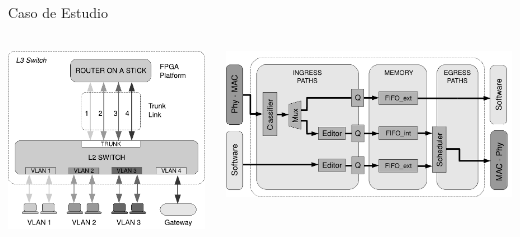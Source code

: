 \documentclass[xcolor=dvipsnames]{beamer}
\begin{document}
\begin{frame}{Caso de Estudio}
  \begin{columns}
    \begin{column}{0.4\textwidth}
      \center
      \includegraphics[scale=0.35]{figures/vlan_scenario}
    \end{column}
    \begin{column}{0.6\textwidth}
      \center
      \includegraphics[scale=0.3]{figures/case}
      \hskip6cm

    \end{column}
  \end{columns}

\end{frame}
\end{document}

